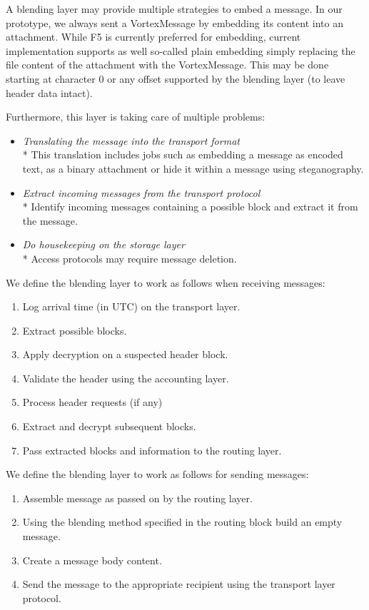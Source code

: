 \documentclass[10pt,journal,compsoc,twocolumn,twoside]{IEEEtran}
\begin{document}
A blending layer may provide multiple strategies to embed a message. In our prototype, we always sent a VortexMessage by embedding its content into an attachment. While F5\cite{f5} is currently preferred for embedding, current implementation supports as well so-called plain embedding simply replacing the file content of the attachment with the VortexMessage. This may be done starting at character 0 or any offset supported by the blending layer (to leave header data intact).

Furthermore, this layer is taking care of multiple problems:
\begin{itemize}
	\item \emph{Translating the message into the transport format}\\*
	This translation includes jobs such as embedding a message as encoded text, as a binary attachment or hide it within a message using steganography.
	\item \emph{Extract incoming messages from the transport protocol}\\*
	Identify incoming messages containing a possible block and extract it from the message.
	\item \emph{Do housekeeping on the storage layer}\\*
	Access protocols may require message deletion.
\end{itemize}

We define the blending layer to work as follows when receiving messages:
\begin{enumerate}
	\item Log arrival time (in UTC) on the transport layer.
	\item Extract possible blocks.
	\item Apply decryption on a suspected header block.
	\item Validate the header using the accounting layer.
	\item Process header requests (if any)
	\item Extract and decrypt subsequent blocks.
	\item Pass extracted blocks and information to the routing layer.
\end{enumerate}

We define the blending layer to work as follows for sending messages:
\begin{enumerate}
	\item Assemble message as passed on by the routing layer.
	\item Using the blending method specified in the routing block build an empty message. 
	\item Create a message body content.
	\item Send the message to the appropriate recipient using the transport layer protocol.
\end{enumerate}
\end{document}
